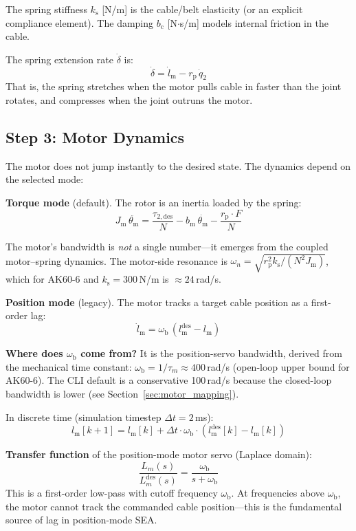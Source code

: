 \documentclass[11pt,a4paper]{article}
\newcommand{\rp}{r_{\mathrm{p}}}
\newcommand{\lm}{l_{\mathrm{m}}}
\newcommand{\lmd}{\dot{l}_{\mathrm{m}}}
\newcommand{\ks}{k_{\mathrm{s}}}
\newcommand{\bc}{b_{\mathrm{c}}}
\newcommand{\wb}{\omega_{\mathrm{b}}}
\newcommand{\Jm}{J_{\mathrm{m}}}
\newcommand{\thetam}{\theta_{\mathrm{m}}}
\begin{document}
The spring stiffness $\ks$ [N/m] is the cable/belt elasticity (or an explicit compliance element).  The damping $\bc$ [N$\cdot$s/m] models internal friction in the cable.

The spring extension rate $\dot{\delta}$ is:
\begin{equation}
    \dot{\delta} = \lmd - \rp \, \dot{q}_2
\end{equation}
That is, the spring stretches when the motor pulls cable in faster than the joint rotates, and compresses when the joint outruns the motor.


\subsection{Step 3: Motor Dynamics}

The motor does not jump instantly to the desired state.  The dynamics depend on the selected mode:

\medskip
\textbf{Torque mode} (default).  The rotor is an inertia loaded by the spring:
\begin{equation}
\boxed{\Jm \, \ddot{\thetam} = \frac{\tau_{2,\mathrm{des}}}{N} - b_{\mathrm{m}} \, \dot{\thetam} - \frac{\rp \cdot F}{N}}
\end{equation}

The motor's bandwidth is \emph{not} a single number---it emerges from the coupled motor--spring dynamics.  The motor-side resonance is $\omega_n = \sqrt{\rp^2 \ks / (N^2 \Jm)}$, which for AK60-6 and $\ks = 300$\,N/m is $\approx 24$\,rad/s.

\medskip
\textbf{Position mode} (legacy).  The motor tracks a target cable position as a first-order lag:
\begin{equation}
\boxed{\lmd = \wb \, (\lm^{\mathrm{des}} - \lm)}
\end{equation}

\textbf{Where does $\wb$ come from?}  It is the position-servo bandwidth, derived from the mechanical time constant: $\wb = 1/\tau_m \approx 400$\,rad/s (open-loop upper bound for AK60-6).  The CLI default is a conservative 100\,rad/s because the closed-loop bandwidth is lower (see Section~\ref{sec:motor_mapping}).

In discrete time (simulation timestep $\Delta t = 2$\,ms):
\begin{equation}
    \lm[k+1] = \lm[k] + \Delta t \cdot \wb \cdot (\lm^{\mathrm{des}}[k] - \lm[k])
\end{equation}

\begin{codemath}
\textbf{Transfer function} of the position-mode motor servo (Laplace domain):
\[
    \frac{L_m(s)}{L_m^{\mathrm{des}}(s)} = \frac{\wb}{s + \wb}
\]
This is a first-order low-pass with cutoff frequency $\wb$.  At frequencies above $\wb$, the motor cannot track the commanded cable position---this is the fundamental source of lag in position-mode SEA.
\end{codemath}
\end{document}
